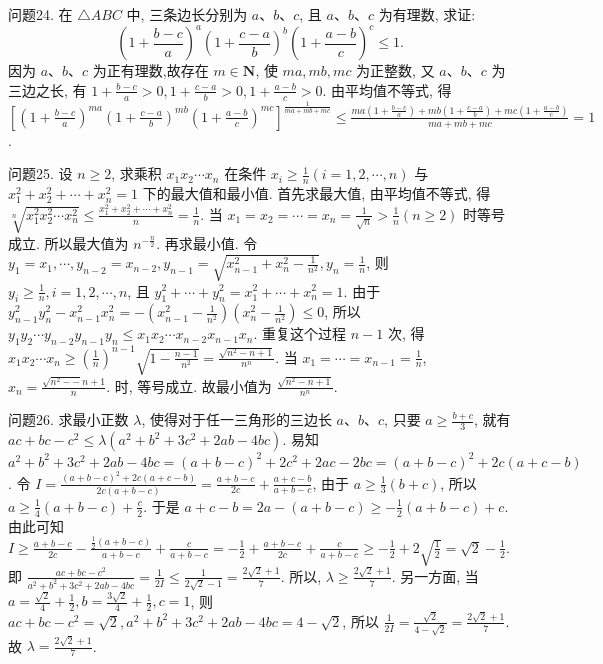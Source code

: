 问题24. 在 $\triangle A B C$ 中, 三条边长分别为 $a 、 b 、 c$, 且 $a 、 b 、 c$ 为有理数, 求证:
$$
\left(1+\frac{b-c}{a}\right)^a\left(1+\frac{c-a}{b}\right)^b\left(1+\frac{a-b}{c}\right)^c \leqslant 1 .
$$
因为 $a 、 b 、 c$ 为正有理数,故存在 $m \in \mathbf{N}$, 使 $m a, m b, m c$ 为正整数, 又 $a 、 b 、 c$ 为三边之长, 有 $1+\frac{b-c}{a}>0,1+\frac{c-a}{b}>0,1+\frac{a-b}{c}>0$. 由平均值不等式, 得 $\left[\left(1+\frac{b-c}{a}\right)^{m a}\left(1+\frac{c-a}{b}\right)^{m b}\left(1+\frac{a-b}{c}\right)^{m c}\right]^{\frac{1}{m a+m b+m c}} \leqslant \frac{m a\left(1+\frac{b-c}{a}\right)+m b\left(1+\frac{c-a}{b}\right)+m c\left(1+\frac{a-b}{c}\right)}{m a+m b+m c}=1$.



问题25. 设 $n \geqslant 2$, 求乘积 $x_1 x_2 \cdots x_n$ 在条件 $x_i \geqslant \frac{1}{n}(i=1,2, \cdots, n)$ 与 $x_1^2+x_2^2+\cdots+x_n^2=1$ 下的最大值和最小值.
首先求最大值, 由平均值不等式, 得 $\sqrt[n]{x_1^2 x_2^2 \cdots x_n^2} \leqslant \frac{x_1^2+x_2^2+\cdots+x_n^2}{n}=\frac{1}{n}$. 当 $x_1=x_2=\cdots=x_n=\frac{1}{\sqrt{n}}>\frac{1}{n}(n \geqslant 2)$ 时等号成立.
所以最大值为 $n^{-\frac{n}{2}}$. 再求最小值.
令 $y_1=x_1, \cdots, y_{n-2}=x_{n-2}, y_{n-1}= \sqrt{x_{n-1}^2+x_n^2-\frac{1}{n^2}}, y_n=\frac{1}{n}$, 则 $y_i \geqslant \frac{1}{n}, i=1,2, \cdots, n$, 且 $y_1^2+\cdots+y_n^2= x_1^2+\cdots+x_n^2=1$. 由于 $y_{n-1}^2 y_n^2-x_{n-1}^2 x_n^2=-\left(x_{n-1}^2-\frac{1}{n^2}\right)\left(x_n^2-\frac{1}{n^2}\right) \leqslant 0$, 所以 $y_1 y_2 \cdots y_{n-2} y_{n-1} y_n \leqslant x_1 x_2 \cdots x_{n-2} x_{n-1} x_n$. 重复这个过程 $n-1$ 次, 得 $x_1 x_2 \cdots x_n \geqslant\left(\frac{1}{n}\right)^{n-1} \sqrt{1-\frac{n-1}{n^2}}=\frac{\sqrt{n^2-n+1}}{n^n}$. 当 $x_1=\cdots=x_{n-1}=\frac{1}{n}$, $x_n=\frac{\sqrt{n^2--} n+1}{n}$. 时, 等号成立.
故最小值为 $\frac{\sqrt{n^2-n+1}}{n^n}$.



问题26. 求最小正数 $\lambda$, 使得对于任一三角形的三边长 $a 、 b 、 c$, 只要 $a \geqslant \frac{b+c}{3}$, 就有 $a c+b c-c^2 \leqslant \lambda\left(a^2+b^2+3 c^2+2 a b-4 b c\right)$.
易知 $a^2+b^2+3 c^2+2 a b-4 b c=(a+b-c)^2+2 c^2+2 a c-2 b c=(a+b-c)^2+2 c(a+c-b)$. 令 $I=\frac{(a+b-c)^2+2 c(a+c-b)}{2 c(a+b-c)}=\frac{a+b-c}{2 c} +\frac{a+c-b}{a+b-c}$, 由于 $a \geqslant \frac{1}{3}(b+c)$, 所以 $a \geqslant \frac{1}{4}(a+b-c)+\frac{c}{2}$. 于是 $a+c- b=2 a-(a+b-c) \geqslant-\frac{1}{2}(a+b-c)+c$. 由此可知 $I \geqslant \frac{a+b-c}{2 c}- \frac{\frac{1}{2}(a+b-c)}{a+b-c}+\frac{c}{a+b-c}=-\frac{1}{2}+\frac{a+b-c}{2 c}+\frac{c}{a+b-c} \geqslant-\frac{1}{2}+2 \sqrt{\frac{1}{2}}= \sqrt{2}-\frac{1}{2}$. 即 $\frac{a c+b c-c^2}{a^2+b^2+3 c^2+2 a b-4 b c}=\frac{1}{2 I} \leqslant \frac{1}{2 \sqrt{2}-1}=\frac{2 \sqrt{2}+1}{7}$. 所以, $\lambda \geqslant \frac{2 \sqrt{2}+1}{7}$. 另一方面, 当 $a=\frac{\sqrt{2}}{4}+\frac{1}{2}, b=\frac{3 \sqrt{2}}{4}+\frac{1}{2}, c=1$, 则 $a c+b c- c^2=\sqrt{2}, a^2+b^2+3 c^2+2 a b-4 b c=4-\sqrt{2}$, 所以 $\frac{1}{2 I}=\frac{\sqrt{2}}{4-\sqrt{2}}=\frac{2 \sqrt{2}+1}{7}$. 故 $\lambda=\frac{2 \sqrt{2}+1}{7}$.



